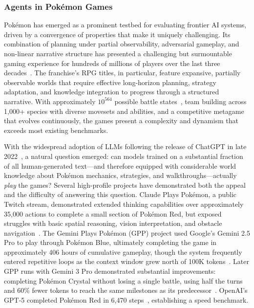 \subsubsection{Agents in Pok\'{e}mon Games}\label{sec:pokemon_agents}

Pok\'{e}mon has emerged as a prominent testbed for evaluating frontier AI systems, driven by a convergence of properties that make it uniquely challenging. Its combination of planning under partial observability, adversarial gameplay, and non-linear narrative structure has presented a challenging but surmountable gaming experience for hundreds of millions of players over the last three decades~\citep{pokemon2025franchise}. The franchise's RPG titles, in particular, feature expansive, partially observable worlds that require effective long-horizon planning, strategy adaptation, and knowledge integration to progress through a structured narrative. With approximately $10^{564}$ possible battle states~\citep{karten2025pokeagent}, team building across 1,000+ species with diverse movesets and abilities, and a competitive metagame that evolves continuously, the games present a complexity and dynamism that exceeds most existing benchmarks.

With the widespread adoption of LLMs following the release of ChatGPT in late 2022~\citep{openai2022chatgpt}, a natural question emerged: can models trained on a substantial fraction of all human-generated text---and therefore equipped with considerable world knowledge about Pok\'{e}mon mechanics, strategies, and walkthroughs---actually \emph{play} the games? Several high-profile projects have demonstrated both the appeal and the difficulty of answering this question. Claude Plays Pok\'{e}mon, a public Twitch stream, demonstrated extended thinking capabilities over approximately 35,000 actions to complete a small section of Pok\'{e}mon Red, but exposed struggles with basic spatial reasoning, vision interpretation, and obstacle navigation~\citep{engadget2025claudeplayspokemon, anthropic2025visible}. The Gemini Plays Pok\'{e}mon (GPP) project used Google's Gemini 2.5 Pro to play through Pok\'{e}mon Blue, ultimately completing the game in approximately 406 hours of cumulative gameplay, though the system frequently entered repetitive loops as the context window grew north of 100K tokens~\citep{zhang2025geminiplayspokemon, gemini2p5report}. Later GPP runs with Gemini 3 Pro demonstrated substantial improvements: completing Pok\'{e}mon Crystal without losing a single battle, using half the turns and 60\% fewer tokens to reach the same milestones as its predecessor~\citep{zhang2025gemini3playspokemon}. OpenAI's GPT-5 completed Pok\'{e}mon Red in 6,470 steps~\citep{engadget2025gptplayspokemon}, establishing a speed benchmark.


